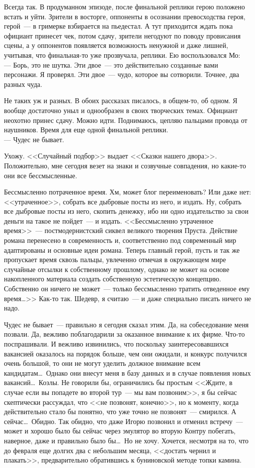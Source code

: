 Всегда так. В продуманном эпизоде, после финальной реплики герою положено 
встать 
и уйти. Зрители в восторге, оппоненты в осознании превосходства героя, 
герой~--- в 
гримерке взбирается на пьедестал. А тут приходится ждать пока официант принесет 
чек, потом сдачу, зрители негодуют по поводу провисания сцены, а у оппонентов 
появляется возможность ненужной и даже лишней, учитывая, что финальная-то уже 
прозвучала, реплики. Ею воспользовался Мо:\\
--- Борь, это не шутка. Эти двое~--- это действительно созданные вами персонажи. 
Я проверял. Эти двое~--- чудо, которое вы сотворили. Точнее, два разных чуда.

Не таких уж и разных. В обоих рассказах писалось, в общем-то, об одном. Я 
вообще 
достаточно уныл и однообразен в своих творческих темах. Официант неохотно 
принес 
сдачу. Можно идти. Поднимаюсь, цепляю пальцами провода от наушников. Время для 
еще одной финальной реплики.\\
--- Чудес не бывает.

Ухожу. <<Случайный подбор>> выдает <<Сказки нашего двора>>. Положительно, мне 
сегодня везет на знаки и созвучные совпадения, но какие-то они все 
бессмысленные.

Бессмысленно потраченное время. Хм, может блог переименовать? Или даже нет: 
<<утраченное>>, собрать все дыбровые посты из него, и издать. Ну, собрать все 
дыбровые посты из него, скопить денежку, ибо ни одно издательство за свои 
деньги на такое не пойдет~--- и издать. <<Бессмысленно утраченное время>>~--- 
постмодернистский сиквел великого творения Пруста. Действие романа перенесено в 
современность и, соответственно под современный мир адаптированы и основные 
идеи романа. Теперь главный герой, пусть и так же пропускает время сквозь пальцы, 
увлеченно отмечая в окружающем мире случайные отсылки к собственному прошлому, 
однако не может на основе накопленного материала создать собственную 
эстетическую концепцию. Собственно он ничего не может~--- только бессмысленно 
тратить отведенное ему время\ldots>> Как-то так. Шедевр, я считаю~--- и даже 
специально писать ничего не надо.

Чудес не бывает~--- правильно я сегодня сказал этим. Да, на собеседование меня 
позвали. Да, вежливо поблагодарили за оказанное внимание к их фирме. Что-то 
поспрашивали. И вежливо извинились, что поскольку заинтересовавшихся вакансией 
оказалось на порядок больше, чем они ожидали, и конкурс получился очень 
большой, то они не могут уделить должное внимание всем кандидатам\ldots\ Однако они 
внесут меня в базу данных и в случае появления новых вакансий\ldots\ Козлы. Не 
говорили бы, ограничились бы простым <<Ждите, в случае если вы попадете во второй тур~--- мы 
вам позвоним>>, я бы сейчас скептически рассуждал, что <<не позвонят, конечно>>, но 
к моменту, когда действительно стало бы понятно, что уже точно не позвонят~--- 
смирился. А сейчас\ldots\ Обидно. Так обидно, что даже Игорю позвонил и отменил 
встречу~--- может и хорошо было бы сейчас через эмулятор во вторую Контру 
побегать, наверное, даже и правильно было бы\ldots\ Но не хочу. Хочется, 
несмотря на то, что до февраля еще долгих два с небольшим месяца, <<достать чернил и 
плакать>>, предварительно обратившись к буниновской методе топки камина.

